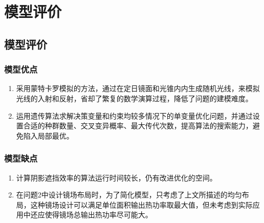 \section{模型评价}
\subsection{模型评价}
\subsubsection{模型优点}
\begin{enumerate}
\item 采用蒙特卡罗模拟的方法，通过在定日镜面和光锥内内生成随机光线，来模拟光线的入射和反射，省却了繁复的数学演算过程，降低了问题的建模难度。
\item 运用遗传算法求解决策变量和约束均较多情况下的单变量优化问题，并通过设置合适的种群数量、交叉变异概率、最大传代次数，提高算法的搜索能力，避免陷入局部最优。
\end{enumerate}

\subsubsection{模型缺点}
\begin{enumerate}
\item 计算阴影遮挡效率的算法运行时间较长，仍有改进优化的空间。 
\item 在问题2中设计镜场布局时，为了简化模型，只考虑了上文所描述的均匀布局，这种镜场设计可以满足单位面积输出热功率取最大值，但未考虑到实际应用中还应使得镜场总输出热功率尽可能大。
\end{enumerate}

